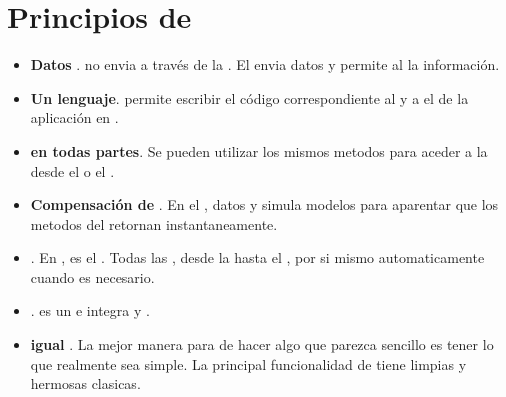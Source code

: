 \section{Principios de \meteor}
\begin{itemize}
	\item \textbf{Datos \onthewire}. \meteor no envia \html a través de la \network. El \server envia datos y permite al \client \render la información.

	\item \textbf{Un lenguaje}. \meteor permite escribir el código correspondiente al \client y a el \server de la aplicación en \javascript.
	\item \textbf{\database en todas partes}. Se pueden utilizar los mismos metodos para aceder a la \database desde el \client o el \server.

	\item \textbf{Compensación de \latency}. En el \client, \meteor \prefetches datos y simula modelos para aparentar que los metodos del \server retornan instantaneamente.

	\item \textbf{\fullstack \reactivity}. En \meteor, \realtime es el . Todas las \layers, desde la \database hasta el \template, \update por si mismo automaticamente cuando es necesario.

	\item \textbf{\embraceecosystem}. \meteor es un \opensource e integra \tools y \frameworks \opensource.

	\item \textbf{\simplicity igual \productivity}. La mejor manera para de hacer algo que parezca sencillo es tener lo que realmente sea simple. La principal funcionalidad de \meteor tiene limpias y hermosas \apis clasicas.

\end{itemize}

